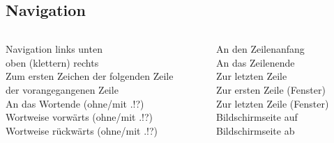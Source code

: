 \documentclass[aspectratio=43]{beamer}
\begin{document}
\subsection{Navigation}
\begin{frame} 
\begin{columns}
        \begin{column}{.5\textwidth}
        \begin{exampleblock}{Navigation} 
         links  unten\\
         oben (klettern)  rechts\\
        \taste{+} Zum ersten Zeichen der folgenden Zeile\\
         der vorangegangenen Zeile\\
         An das Wortende (ohne/mit .!?)\\
         Wortweise vorwärts (ohne/mit .!?)\\
         Wortweise rückwärts (ohne/mit .!?)\\

        \end{exampleblock}
        \end{column} 
        
        \begin{column}{.5\textwidth} 
        \begin{exampleblock}{} 
         An den Zeilenanfang\\
        \taste{\$} An das Zeilenende\\
         Zur letzten Zeile\\
         Zur ersten Zeile (Fenster) \\
         Zur letzten Zeile (Fenster)\\
          Bildschirmseite auf\\
          Bildschirmseite ab
                \end{exampleblock}
        \end{column} 
\end{columns}
\end{frame}
\end{document}
